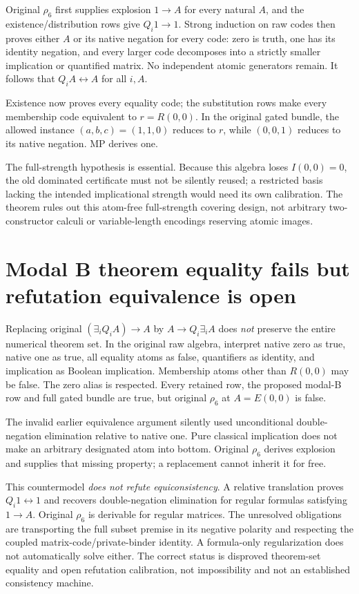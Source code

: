 \documentclass[11pt]{article}
\begin{document}
Original $\rho_6$ first supplies explosion $1\to A$ for every natural $A$, and the existence/distribution rows give $Q_i1\to1$. Strong induction on raw codes then proves either $A$ or its native negation for every code: zero is truth, one has its identity negation, and every larger code decomposes into a strictly smaller implication or quantified matrix. No independent atomic generators remain. It follows that $Q_iA\leftrightarrow A$ for all $i,A$.

Existence now proves every equality code; the substitution rows make every membership code equivalent to $r=R(0,0)$. In the original gated bundle, the allowed instance $(a,b,c)=(1,1,0)$ reduces to $r$, while $(0,0,1)$ reduces to its native negation. MP derives one.

The full-strength hypothesis is essential. Because this algebra loses $I(0,0)=0$, the old dominated certificate must not be silently reused; a restricted basis lacking the intended implicational strength would need its own calibration. The theorem rules out this atom-free full-strength covering design, not arbitrary two-constructor calculi or variable-length encodings reserving atomic images.

\section{Modal B theorem equality fails but refutation equivalence is open}
Replacing original $(\exists_iQ_iA)\to A$ by $A\to Q_i\exists_iA$ does \emph{not} preserve the entire numerical theorem set. In the original raw algebra, interpret native zero as true, native one as true, all equality atoms as false, quantifiers as identity, and implication as Boolean implication. Membership atoms other than $R(0,0)$ may be false. The zero alias is respected. Every retained row, the proposed modal-B row and full gated bundle are true, but original $\rho_6$ at $A=E(0,0)$ is false.

The invalid earlier equivalence argument silently used unconditional double-negation elimination relative to native one. Pure classical implication does not make an arbitrary designated atom into bottom. Original $\rho_6$ derives explosion and supplies that missing property; a replacement cannot inherit it for free.

This countermodel \emph{does not refute equiconsistency}. A relative translation proves $Q_i1\leftrightarrow1$ and recovers double-negation elimination for regular formulas satisfying $1\to A$. Original $\rho_6$ is derivable for regular matrices. The unresolved obligations are transporting the full subset premise in its negative polarity and respecting the coupled matrix-code/private-binder identity. A formula-only regularization does not automatically solve either. The correct status is disproved theorem-set equality and open refutation calibration, not impossibility and not an established consistency machine.
\end{document}
